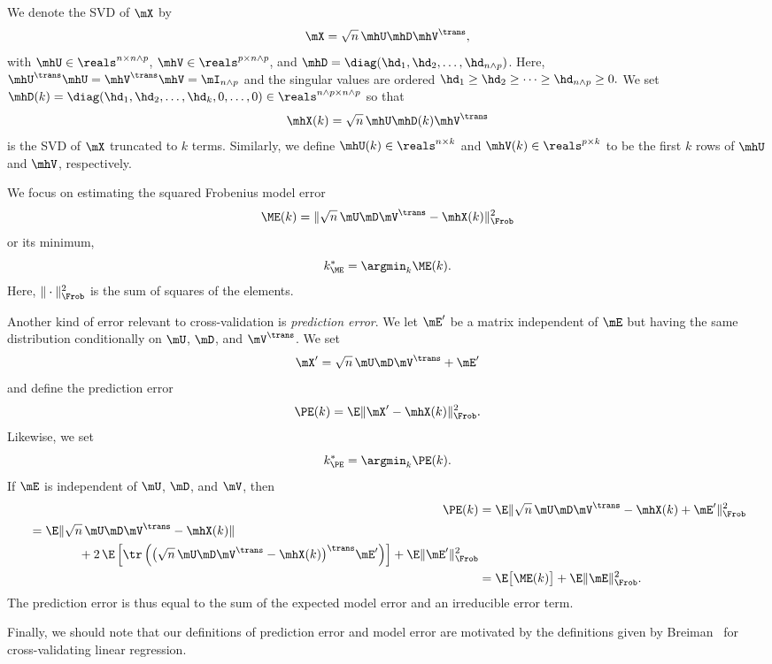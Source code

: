 We denote the SVD of $\mX$ by
\[
    \mX = \sqrt{n} \, \mhU \mhD \mhV^\trans, 
\]
with $\mhU \in \reals^{n \times n \wedge p}$, $\mhV \in \reals^{p \times n
\wedge p}$, and $\mhD = \diag( \hd_1, \hd_2, \ldots, \hd_{n \wedge p})$. Here,
$\mhU^\trans \mhU = \mhV^\trans \mhV = \mI_{n \wedge p}$ and the singular
values are ordered
\(
    \hd_1 \geq \hd_2 \geq \cdots \geq \hd_{n \wedge p} \geq 0.
\)
We set $\mhD(k) = \diag( \hd_1, \hd_2, \ldots, \hd_k, 0, \ldots, 0) \in \reals^{n \wedge p \times n \wedge p}$ so that
\[
    \mhX(k) = \sqrt{n} \, \mhU \mhD(k) \mhV^\trans
\]
is the SVD of $\mX$ truncated to $k$ terms.  Similarly, we define $\mhU(k) \in 
\reals^{n \times k}$ and $\mhV(k) \in \reals^{p \times k}$ to be the first $k$ 
rows of $\mhU$ and $\mhV$, respectively.

We focus on estimating the squared Frobenius model error
\[
    \ME(k) = \| \sqrt{n} \, \mU \mD \mV^\trans - \mhX(k) \|_\Frob^2
\]
or its minimum,
\[
    k^\ast_{\ME} = \argmin_k \ME(k).
\]  
Here, $\| \cdot \|_\Frob^2$ is the sum of squares of the elements.

Another kind of error relevant to cross-validation is \emph{prediction error}.  We let $\mE'$ be a matrix independent of $\mE$ but having the same distribution conditionally on $\mU$, $\mD$, and $\mV^\trans$.  We set 
\[
    \mX' = \sqrt{n} \, \mU \mD \mV^\trans + \mE'
\]
and define the prediction error
\[
    \PE(k) = \E \| \mX' - \mhX(k) \|_\Frob^2.
\]
Likewise, we set
\[
    k^\ast_{\PE} = \argmin_k \PE(k).
\]
If $\mE$ is independent of $\mU$, $\mD$, and $\mV$, then
\begin{align*}
    \PE(k) 
        &= \E\| \sqrt{n} \, \mU \mD \mV^\trans - \mhX(k) + \mE' \|_\Frob^2 \\
    \begin{split}
        &= \E\| \sqrt{n} \, \mU \mD \mV^\trans - \mhX(k) \| \\
           &\qquad\qquad+ 
           2 \, 
           \E \left[
               \tr \left( 
                   \big( \sqrt{n} \, \mU \mD \mV^\trans - \mhX(k) \big)^\trans 
                   \mE'
               \right)
           \right]
           +
           \E\| \mE' \|_\Frob^2 
    \end{split} \\
        &= \E\big[\ME(k)\big] + \E \| \mE \|_\Frob^2.
\end{align*}
The prediction error is thus equal to the sum of the expected model error
and an irreducible error term.

Finally, we should note that our definitions of prediction error and model
error are motivated by the definitions given by
Breiman~\cite{breiman1992little} for cross-validating linear regression.


